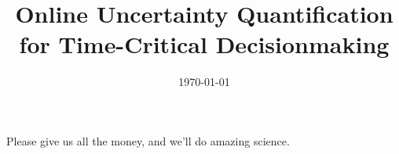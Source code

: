 \documentclass[a4paper,fontsize=12pt]{scrartcl}
\author{}
\date{\today}
\title{Online Uncertainty Quantification for Time-Critical Decisionmaking}
\begin{document}
\maketitle

Please give us all the money, and we'll do amazing science.

\printbibliography[title=References]
\end{document}
